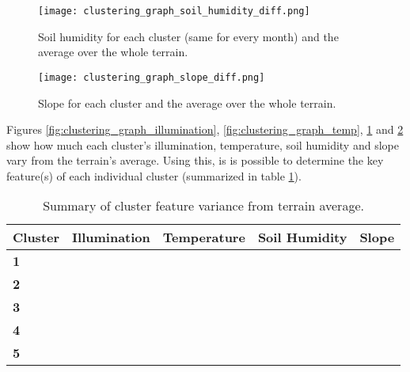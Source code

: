 \begin{figure}
\center
	\texttt{[image: clustering\_graph\_soil\_humidity\_diff.png]}
	\caption{ Soil humidity for each cluster (same for every month) and the average over the whole terrain.}	
	\label{fig:clustering_graph_humidity}
\end{figure}

\begin{figure}
\center
	\texttt{[image: clustering\_graph\_slope\_diff.png]}
	\caption{ Slope for each cluster and the average over the whole terrain.}	
	\label{fig:clustering_graph_slope}
\end{figure}

Figures \ref{fig:clustering_graph_illumination}, \ref{fig:clustering_graph_temp}, \ref{fig:clustering_graph_humidity} and \ref{fig:clustering_graph_slope} show how much each cluster's illumination, temperature, soil humidity and slope vary from the terrain's average. Using this, is is possible to determine the key feature(s) of each individual cluster (summarized in table \ref{tab:clustering_test_cluster_variance}).

\begin{table}[]
  \centering
	    \begin{tabular}{|p{3cm}|p{3cm}|p{3cm}|p{3cm}|p{3cm}|}
		\hline	
  	    \textbf{Cluster} &  \textbf{Illumination} & \textbf{Temperature} & \textbf{Soil Humidity} & \textbf{Slope} \\
		\hline
		\textbf{1} & \textuparrow & \textdownarrow & \textrightarrow & \textdownarrow \textdownarrow \\
		\hline
		\textbf{2} & \textrightarrow & \textuparrow & \textrightarrow & \textuparrow \\
		\hline
		\textbf{3} & \textrightarrow & \textrightarrow & \textrightarrow & \textuparrow \textuparrow \textuparrow \\
		\hline
		\textbf{4} & \textdownarrow \textdownarrow & \textuparrow \textuparrow & \textuparrow \textuparrow \textuparrow & \textrightarrow \\
		\hline
		\textbf{5} & \textdownarrow & \textuparrow & \textdownarrow \textdownarrow & \textuparrow \\
		\hline
		\end{tabular}
		\caption{Summary of cluster feature variance from terrain average.}
	  \label{tab:clustering_test_cluster_variance}
\end{table}